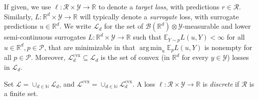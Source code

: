 \documentclass[11pt]{article} %
\newcommand{\Comments}{1}
\newcommand{\mytodo}[2]{\ifnum\Comments=1%
	\todo[linecolor=#1!80!black,backgroundcolor=#1,bordercolor=#1!80!black]{#2}\fi}
\newcommand{\btw}[1]{}%
\newcommand{\reals}{\mathbb{R}}
\newcommand{\simplex}{\Delta_\Y}
\newcommand{\A}{\mathcal{A}}
\newcommand{\E}{\mathbb{E}}
\renewcommand{\L}{\mathcal{L}}
\newcommand{\Lcvx}{\mathcal{L}^{\mathrm{cvx}}}
\newcommand{\R}{\mathcal{R}}
\renewcommand{\P}{\mathcal{P}}
\newcommand{\Y}{\mathcal{Y}}
\newcommand{\exploss}[3]{\E_{#3} #1(#2,Y)}
\DeclareMathOperator*{\argmin}{arg\,min}
\begin{document}
If given, we use $\ell: \R \times \Y \to \reals$ to denote a \emph{target loss}, with predictions $r\in\R$.
Similarly, $L: \reals^d \times \Y \to \reals$ will typically denote a \emph{surrogate} loss, with surrogate predictions $u \in \reals^d$.
We write $\L_d $ for the set of $\mathcal{B}(\reals^d) \otimes \Y$-measurable and lower semi-continuous surrogates $L : \reals^d \times\Y \to \reals$ such that $\E_{Y \sim p} L(u,Y) < \infty$ for all $u \in \reals^d, p \in \P$, that are minimizable in that $\argmin_{u} \exploss{L}{u}{p}$ is nonempty for all $p\in\P$.
Moreover, $\Lcvx_d \subseteq \L_d$ is the set of convex (in $\reals^d$ for every $y \in \Y$) losses in $\L_d$.
\btw{Sufficient condition for $\A$-normal convex integrand: $L$ is lower semi-continuous and $\mathcal{B}(\A) \otimes \Y$-measurable; $\E_p L(u,Y)$ finite for all $u, p$, there exists a $u_0$ for each $p$ so that $\E_p L(u_0, Y)$ is finite and continuous for Rockefellar's corollary, though it's stricter than Ioffe and Tokhimorov IIRC}
Set $\L = \cup_{d \in \mathbb{N}} \L_d$, and $\Lcvx = \cup_{d \in \mathbb{N}} \Lcvx_d$.
A loss $\ell: \R\times \Y \to \reals$ is \emph{discrete} if $\R$ is a finite set.


\end{document}
